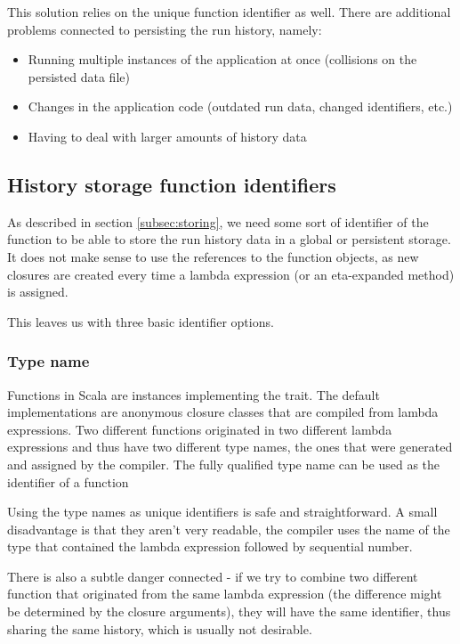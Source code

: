 This solution relies on the unique function identifier as well. There are additional problems connected to persisting the run history, namely:
\begin{itemize}
	\item Running multiple instances of the application at once (collisions on the persisted data file)
	\item Changes in the application code (outdated run data, changed identifiers, etc.)
	\item Having to deal with larger amounts of history data
\end{itemize}

\subsection{History storage function identifiers}
\label{subsec:function_identifiers}

As described in section \ref{subsec:storing}, we need some sort of identifier of the function to be able to store the run history data in a global or persistent storage. It does not make sense to use the references to the function objects, as new closures are created every time a lambda expression (or an eta-expanded method) is assigned.


This leaves us with three basic identifier options.

\subsubsection{Type name}

Functions in Scala are instances implementing the  trait. The default implementations are anonymous closure classes that are compiled from lambda expressions. Two different functions originated in two different lambda expressions and thus have two different type names, the ones that were generated and assigned by the compiler. The fully qualified type name can be used as the identifier of a function

Using the type names as unique identifiers is safe and straightforward. A small disadvantage is that they aren't very readable, the compiler uses the name of the type that contained the lambda expression followed by sequential number. 

There is also a subtle danger connected - if we try to combine two different function that originated from the same lambda expression (the difference might be determined by the closure arguments), they will have the same identifier, thus sharing the same history, which is usually not desirable.

